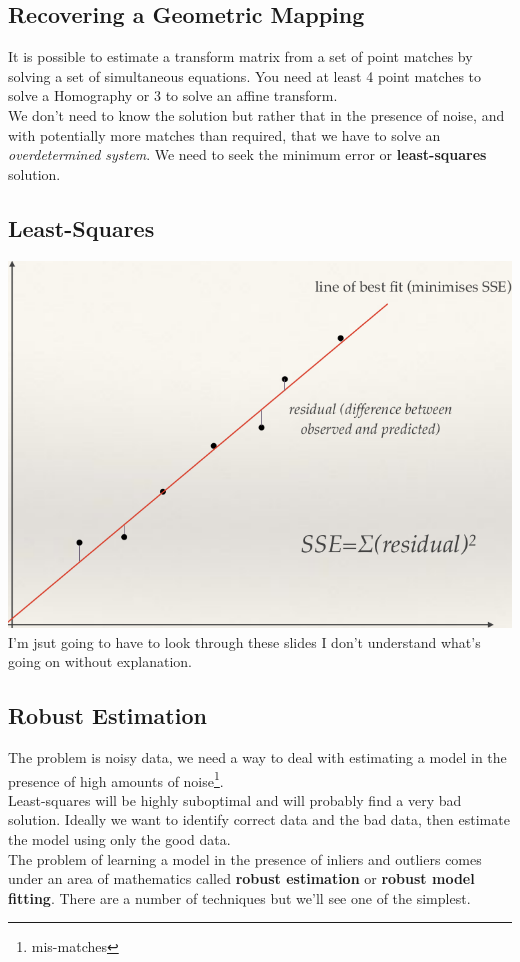 \documentclass{article}
\begin{document}
	\subsection{Recovering a Geometric Mapping}
	It is possible to estimate a transform matrix from a set of point matches by solving a set of simultaneous equations. You need at least 4 point matches to solve a Homography or 3 to solve an affine transform.\\
	We don't need to know the solution but rather that in the presence of noise, and with potentially more matches than required, that we have to solve an \textit{overdetermined system}. We need to seek the minimum error or \textbf{least-squares} solution.
	\subsection{Least-Squares}
	\includegraphics[width=\linewidth]{least_squares}
	I'm jsut going to have to look through these slides I don't understand what's going on without explanation.
	\subsection{Robust Estimation}
	The problem is noisy data, we need a way to deal with estimating a model in the presence of high amounts of noise\footnote{mis-matches}.\\
	Least-squares will be highly suboptimal and will probably find a very bad solution. Ideally we want to identify correct data and the bad data, then estimate the model using only the good data.\\
	The problem of learning a model in the presence of inliers and outliers comes under an area of mathematics called \textbf{robust estimation} or \textbf{robust model fitting}. There are a number of techniques but we'll see one of the simplest.
\end{document}

